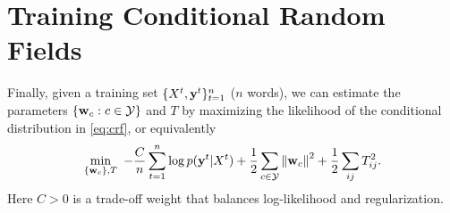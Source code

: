 \documentclass[11pt]{report}
\begin{document}
%
%
%
%
%
%
%

\section{Training Conditional Random Fields}

Finally, given a training set $\{X^t, \mathbf{\boldsymbol{y}}^t\}_{t=1}^n$ ($n$ words),
we can estimate the parameters $\{\mathbf{\boldsymbol{w}}_c : c \in \mathcal{Y}\}$ and $T$ by maximizing the likelihood of the conditional distribution in \eqref{eq:crf}, or equivalently
\begin{align}
	\label{eq:obj_MLE}
	\min_{\{\mathbf{\boldsymbol{w}}_c\}, T} \ -\frac{C}{n}\sum_{t=1}^n \log p(\mathbf{\boldsymbol{y}}^t | X^t) 
	+ \frac{1}{2} \sum_{c \in \mathcal{Y}} \left\|\mathbf{\boldsymbol{w}}_c\right\|^2 
	+ \frac{1}{2} \sum_{ij} T^2_{ij}.
\end{align}
Here $C > 0$ is a trade-off weight that balances log-likelihood and regularization.
\end{document}
